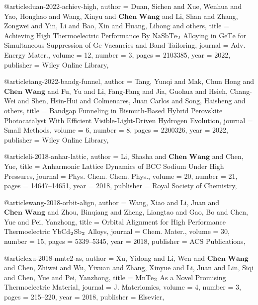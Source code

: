 @article{duan-2022-achiev-high,
  author =	 {Duan, Sichen and Xue, Wenhua and Yao, Honghao and Wang, Xinyu and $\textbf{Chen Wang}$ and Li, Shan and Zhang,
                  Zongwei and Yin, Li and Bao, Xin and Huang, Lihong and others},
  title =	 {Achieving High Thermoelectric Performance By $\mathrm{NaSbTe}$$\textsubscript{2}$ Alloying in $\mathrm{GeTe}$ for Simultaneous Suppression of
                  $\mathrm{Ge}$ Vacancies and Band Tailoring},
  journal =	 {Adv. Energy Mater.},
  volume =	 12,
  number =	 3,
  pages =	 2103385,
  year =	 2022,
  publisher =	 {Wiley Online Library},
}

@article{tang-2022-bandg-funnel,
  author =	 {Tang, Yunqi and Mak, Chun Hong and $\textbf{Chen Wang}$ and Fu, Yu and Li, Fang-Fang and Jia, Guohua
                  and Hsieh, Chang-Wei and Shen, Hsin-Hui and Colmenares, Juan Carlos and Song, Haisheng and others},
  title =	 {Bandgap Funneling in Bismuth-Based Hybrid Perovskite Photocatalyst With Efficient Visible-Light-Driven
                  Hydrogen Evolution},
  journal =	 {Small Methods},
  volume =	 6,
  number =	 8,
  pages =	 2200326,
  year =	 2022,
  publisher =	 {Wiley Online Library},
}

@article{li-2018-anhar-lattic,
  author =	 {Li, Shasha and $\textbf{Chen Wang}$ and Chen, Yue},
  title =	 {Anharmonic Lattice Dynamics of $\mathrm{BCC}$ Sodium Under High Pressures},
  journal =	 {Phys. Chem. Chem. Phys.},
  volume =	 20,
  number =	 21,
  pages =	 {14647--14651},
  year =	 2018,
  publisher =	 {Royal Society of Chemistry},
}

@article{wang-2018-orbit-align,
  author =	 {Wang, Xiao and Li, Juan and $\textbf{Chen Wang}$ and Zhou, Binqiang and Zheng, Liangtao and Gao, Bo and Chen,
                  Yue and Pei, Yanzhong},
  title =	 {Orbital Alignment for High Performance Thermoelectric $\mathrm{YbCd}$$\textsubscript{2}$$\mathrm{Sb}$$\textsubscript{2}$ Alloys},
  journal =	 {Chem. Mater.},
  volume =	 30,
  number =	 15,
  pages =	 {5339--5345},
  year =	 2018,
  publisher =	 {ACS Publications},
}

@article{xu-2018-mnte2-as,
  author =	 {Xu, Yidong and Li, Wen and $\textbf{Chen Wang}$ and Chen, Zhiwei and Wu, Yixuan and Zhang, Xinyue and Li, Juan
                  and Lin, Siqi and Chen, Yue and Pei, Yanzhong},
  title =	 {$\mathrm{MnTe}$$\textsubscript{2}$ As a Novel Promising Thermoelectric Material},
  journal =	 {J. Materiomics},
  volume =	 4,
  number =	 3,
  pages =	 {215--220},
  year =	 2018,
  publisher =	 {Elsevier},
}


